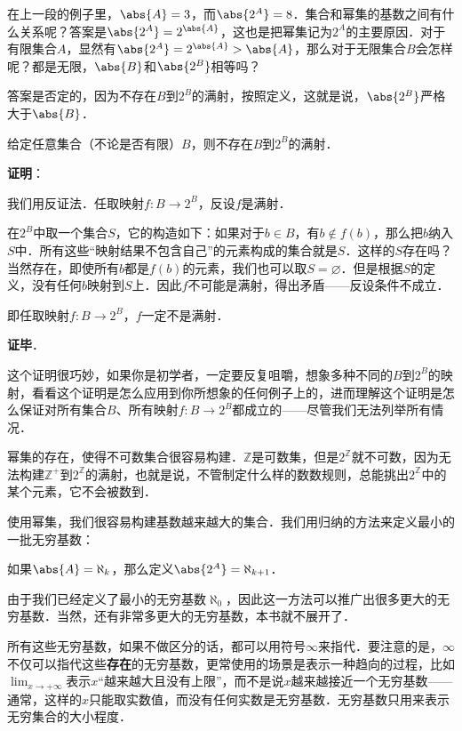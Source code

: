在上一段的例子里，$\abs{A}=3$，而$\abs{2^A}=8$．集合和幂集的基数之间有什么关系呢？答案是$\abs{2^A}=2^{\abs{A}}$，这也是把幂集记为$2^A$的主要原因．对于有限集合$A$，显然有$\abs{2^A}=2^{\abs{A}}>\abs{A}$，那么对于无限集合$B$会怎样呢？都是无限，$\abs{B}$和$\abs{2^B}$相等吗？

答案是否定的，因为不存在$B$到$2^B$的满射，按照定义，这就是说，$\abs{2^B}$严格大于$\abs{B}$．

\begin{theorem}{}
给定任意集合（不论是否有限）$B$，则不存在$B$到$2^B$的满射．
\end{theorem}

\textbf{证明}：

我们用反证法．任取映射$f:B\rightarrow 2^B$，反设$f$是满射．

在$2^B$中取一个集合$S$，它的构造如下：如果对于$b\in B$，有$b\not\in f(b)$，那么把$b$纳入$S$中．所有这些“映射结果不包含自己”的元素构成的集合就是$S$．这样的$S$存在吗？当然存在，即使所有$b$都是$f(b)$的元素，我们也可以取$S=\varnothing$．但是根据$S$的定义，没有任何$b$映射到$S$上．因此$f$不可能是满射，得出矛盾——反设条件不成立．

即任取映射$f:B\rightarrow 2^B$，$f$一定不是满射．

\textbf{证毕}．

这个证明很巧妙，如果你是初学者，一定要反复咀嚼，想象多种不同的$B$到$2^B$的映射，看看这个证明是怎么应用到你所想象的任何例子上的，进而理解这个证明是怎么保证对所有集合$B$、所有映射$f:B\rightarrow 2^B$都成立的——尽管我们无法列举所有情况．

幂集的存在，使得不可数集合很容易构建．$\mathbb{Z}$是可数集，但是$2^{\mathbb{Z}}$就不可数，因为无法构建$\mathbb{Z}^+$到$2^{\mathbb{Z}}$的满射，也就是说，不管制定什么样的数数规则，总能挑出$2^{\mathbb{Z}}$中的某个元素，它不会被数到．

使用幂集，我们很容易构建基数越来越大的集合．我们用归纳的方法来定义最小的一批无穷基数：
\begin{definition}{}
如果$\abs{A}=\aleph_k$，那么定义$\abs{2^A}=\aleph_{k+1}$．
\end{definition}
由于我们已经定义了最小的无穷基数$\aleph_0$，因此这一方法可以推广出很多更大的无穷基数．当然，还有非常多更大的无穷基数，本书就不展开了．

所有这些无穷基数，如果不做区分的话，都可以用符号$\infty$来指代．要注意的是，$\infty$不仅可以指代这些\textbf{存在}的无穷基数，更常使用的场景是表示一种趋向的过程，比如$\lim_{x\rightarrow +\infty}$表示$x$“越来越大且没有上限”，而不是说$x$越来越接近一个无穷基数——通常，这样的$x$只能取实数值，而没有任何实数是无穷基数．无穷基数只用来表示无穷集合的大小程度．


